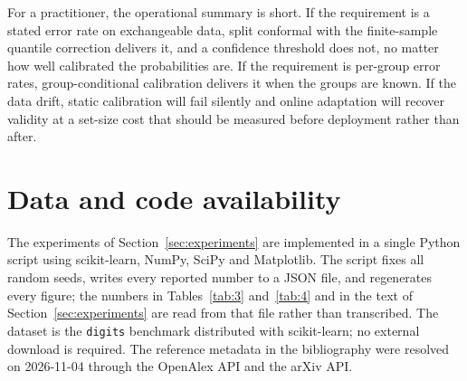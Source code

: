 \documentclass[a4paper,longmktitle]{cas-sc}
\begin{document}
For a practitioner, the operational summary is short. If the requirement is a stated error rate on exchangeable data, split conformal with the finite-sample quantile correction delivers it, and a confidence threshold does not, no matter how well calibrated the probabilities are. If the requirement is per-group error rates, group-conditional calibration delivers it when the groups are known. If the data drift, static calibration will fail silently and online adaptation will recover validity at a set-size cost that should be measured before deployment rather than after.

\section*{Data and code availability}

The experiments of Section~\ref{sec:experiments} are implemented in a single Python script using scikit-learn, NumPy, SciPy and Matplotlib. The script fixes all random seeds, writes every reported number to a JSON file, and regenerates every figure; the numbers in Tables~\ref{tab:3} and~\ref{tab:4} and in the text of Section~\ref{sec:experiments} are read from that file rather than transcribed. The dataset is the \texttt{digits} benchmark distributed with scikit-learn; no external download is required. The reference metadata in the bibliography were resolved on 2026-11-04 through the OpenAlex API and the arXiv API.
\end{document}
